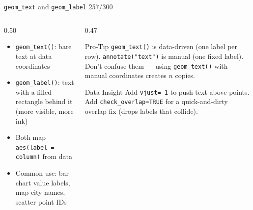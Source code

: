\documentclass[10pt]{beamer}
\newcommand{\smark}[1]{\hfill{\scriptsize\color{codegray}#1}}
\begin{document}
\begin{frame}{\texttt{geom\_text} and \texttt{geom\_label}}
\smark{257/300}
\begin{columns}[T]
\begin{column}{0.50\textwidth}
\begin{itemize}
    \item \texttt{geom\_text()}: bare text at data coordinates
    \item \texttt{geom\_label()}: text with a filled rectangle behind it (more visible, more ink)
    \item Both map \texttt{aes(label = column)} from data
    \item Common use: bar chart value labels, map city names, scatter point IDs
\end{itemize}
\end{column}
\begin{column}{0.47\textwidth}
\begin{alertblock}{Pro-Tip}
    \scriptsize \texttt{geom\_text()} is data-driven (one label per row). \texttt{annotate("text")} is manual (one fixed label). Don't confuse them --- using \texttt{geom\_text()} with manual coordinates creates $n$ copies.
\end{alertblock}
\vspace{0.2cm}
\begin{exampleblock}{Data Insight}
    \scriptsize Add \texttt{vjust=-1} to push text above points. Add \texttt{check\_overlap=TRUE} for a quick-and-dirty overlap fix (drops labels that collide).
\end{exampleblock}
\end{column}
\end{columns}
\end{frame}
\end{document}

